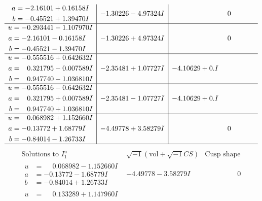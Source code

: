 \documentclass[1p]{elsarticle_modified}
\theoremstyle{definition}
\newcommand{\I}{\sqrt{-1}}
\begin{document}
$$\begin{array}{c|c|c}
\begin{aligned}
a &= -2.16101 + 0.16158 I \\
b &= -0.45521 + 1.39470 I\end{aligned}
 & -1.30226 - 4.97324 I & \phantom{-0.000000 } 0 \\ \hline\begin{aligned}
u &= -0.293441 - 1.107970 I \\
a &= -2.16101 - 0.16158 I \\
b &= -0.45521 - 1.39470 I\end{aligned}
 & -1.30226 + 4.97324 I & \phantom{-0.000000 } 0 \\ \hline\begin{aligned}
u &= -0.555516 + 0.642632 I \\
a &= \phantom{-}0.321795 - 0.007589 I \\
b &= \phantom{-}0.947740 - 1.036810 I\end{aligned}
 & -2.35481 + 1.07727 I & -4.10629 + 0. I\phantom{ +0.000000I} \\ \hline\begin{aligned}
u &= -0.555516 - 0.642632 I \\
a &= \phantom{-}0.321795 + 0.007589 I \\
b &= \phantom{-}0.947740 + 1.036810 I\end{aligned}
 & -2.35481 - 1.07727 I & -4.10629 + 0. I\phantom{ +0.000000I} \\ \hline\begin{aligned}
u &= \phantom{-}0.068982 + 1.152660 I \\
a &= -0.13772 + 1.68779 I \\
b &= -0.84014 - 1.26733 I\end{aligned}
 & -4.49778 + 3.58279 I & \phantom{-0.000000 } 0\\
 \hline 
 \end{array}$$\newpage$$\begin{array}{c|c|c}  
\text{Solutions to }I^u_{1}& \I (\text{vol} + \sqrt{-1}CS) & \text{Cusp shape}\\
 \hline 
\begin{aligned}
u &= \phantom{-}0.068982 - 1.152660 I \\
a &= -0.13772 - 1.68779 I \\
b &= -0.84014 + 1.26733 I\end{aligned}
 & -4.49778 - 3.58279 I & \phantom{-0.000000 } 0 \\ \hline\begin{aligned}
u &= \phantom{-}0.133289 + 1.147960 I \\

\end{aligned}
\end{array}$$
\end{document}

